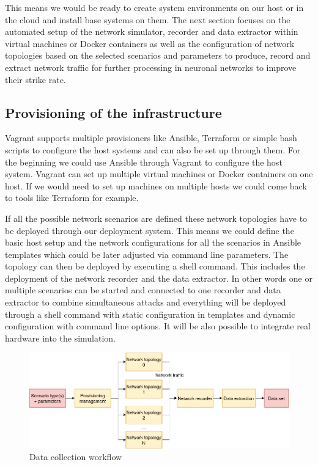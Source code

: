 \documentclass[conference]{IEEEtran}
\begin{document}
This means we would be ready to create system environments on our host or in the cloud and install base systems on them. The next section focuses on the automated setup of the network simulator, recorder and data extractor within virtual machines or Docker containers as well as the configuration of network topologies based on the selected scenarios and parameters to produce, record and extract network traffic for further processing in neuronal networks to improve their strike rate.

\subsection{Provisioning of the infrastructure}

Vagrant supports multiple provisioners like Ansible, Terraform or simple bash scripts to configure the host systems and can also be set up through them. For the beginning we could use Ansible through Vagrant to configure the host system. Vagrant can set up multiple virtual machines or Docker containers on one host. If we would need to set up machines on multiple hosts we could come back to tools like Terraform for example. \cite{b9} \cite{b10} \cite{b11}

If all the possible network scenarios are defined these network topologies have to be deployed through our deployment system. This means we could define the basic host setup and the network configurations for all the scenarios in Ansible templates which could be later adjusted via command line parameters. The topology can then be deployed by executing a shell command. This includes the deployment of the network recorder and the data extractor. In other words one or multiple scenarios can be started and connected to one recorder and data extractor to combine simultaneous attacks and everything will be deployed through a shell command with static configuration in templates and dynamic configuration with command line options. It will be also possible to integrate real hardware into the simulation. \cite{b9}

\begin{figure}[htbp]
\centerline{\includegraphics[scale=0.28]{design_flow.png}}
\caption{Data collection workflow}
\label{design-flow}
\end{figure}
\end{document}
